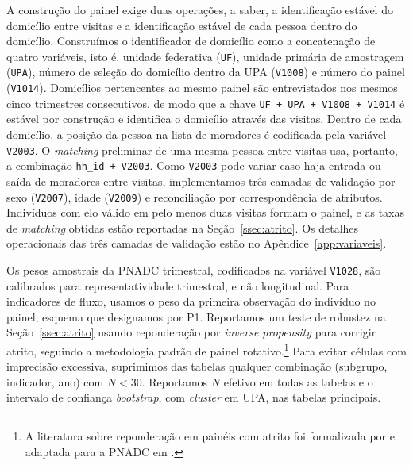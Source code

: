 A construção do painel exige duas operações, a saber, a
identificação estável do domicílio entre visitas e a identificação
estável de cada pessoa dentro do domicílio. Construímos o
identificador de domicílio como a concatenação de quatro variáveis,
isto é, unidade federativa (\texttt{UF}), unidade primária de
amostragem (\texttt{UPA}), número de seleção do domicílio dentro
da UPA (\texttt{V1008}) e número do painel (\texttt{V1014}).
Domicílios pertencentes ao mesmo painel são entrevistados nos
mesmos cinco trimestres consecutivos, de modo que a chave
\texttt{UF + UPA + V1008 + V1014} é estável por construção e
identifica o domicílio através das visitas. Dentro de cada
domicílio, a posição da pessoa na lista de moradores é codificada
pela variável \texttt{V2003}. O \emph{matching} preliminar de uma
mesma pessoa entre visitas usa, portanto, a combinação
\texttt{hh\_id + V2003}. Como \texttt{V2003} pode variar caso haja
entrada ou saída de moradores entre visitas, implementamos três
camadas de validação por sexo (\texttt{V2007}), idade (\texttt{V2009})
e reconciliação por correspondência de atributos. Indivíduos com elo
válido em pelo menos duas visitas formam o painel, e as taxas de
\emph{matching} obtidas estão reportadas na
Seção~\ref{ssec:atrito}. Os detalhes operacionais das três camadas
de validação estão no Apêndice~\ref{app:variaveis}.

Os pesos amostrais da PNADC trimestral, codificados na variável
\texttt{V1028}, são calibrados para representatividade trimestral,
e não longitudinal. Para indicadores de fluxo, usamos o peso da
primeira observação do indivíduo no painel, esquema que designamos
por P1. Reportamos um teste de robustez na
Seção~\ref{ssec:atrito} usando reponderação por \emph{inverse
propensity} para corrigir atrito, seguindo a metodologia padrão
de painel rotativo.\footnote{A literatura sobre reponderação em
painéis com atrito foi formalizada por
\citet{wooldridge_2007_attrition} e adaptada para a PNADC em
\citet{IPEA2022_painel}.} Para evitar células com imprecisão
excessiva, suprimimos das tabelas qualquer combinação (subgrupo,
indicador, ano) com $N < 30$. Reportamos $N$ efetivo em todas as
tabelas e o intervalo de confiança \emph{bootstrap}, com
\emph{cluster} em UPA, nas tabelas principais.

